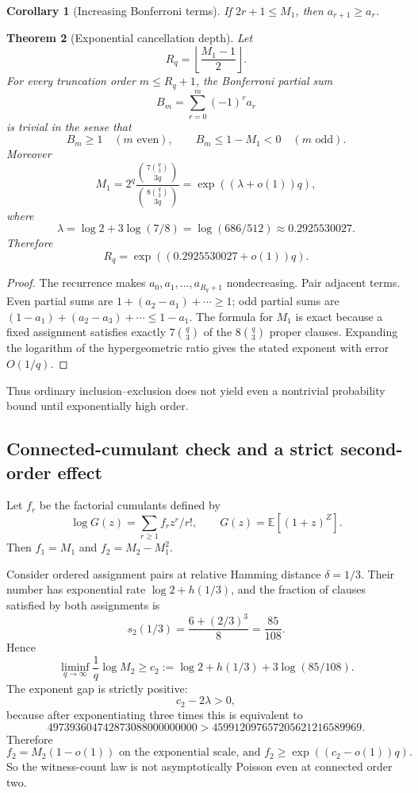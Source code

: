\documentclass[11pt]{article}
\newtheorem{theorem}{Theorem}
\newtheorem{corollary}[theorem]{Corollary}
\begin{document}
\begin{corollary}[Increasing Bonferroni terms]
If $2r+1\le M_1$, then $a_{r+1}\ge a_r$.
\end{corollary}

\begin{theorem}[Exponential cancellation depth]
Let
\[R_q=\left\lfloor\frac{M_1-1}{2}\right\rfloor.\]
For every truncation order $m\le R_q+1$, the Bonferroni partial sum
\[B_m=\sum_{r=0}^m(-1)^ra_r\]
is trivial in the sense that
\[B_m\ge1\quad(m\text{ even}),\qquad B_m\le1-M_1<0\quad(m\text{ odd}).\]
Moreover
\[M_1=2^q\frac{\binom{7\binom q3}{3q}}{\binom{8\binom q3}{3q}}=\exp((\lambda+o(1))q),\]
where
\[\lambda=\log2+3\log(7/8)=\log(686/512)\approx0.2925530027.\]
Therefore
\[\boxed{R_q=\exp((0.2925530027+o(1))q).}\]
\end{theorem}
\begin{proof}
The recurrence makes $a_0,a_1,\ldots,a_{R_q+1}$ nondecreasing. Pair adjacent terms. Even partial sums are $1+(a_2-a_1)+\cdots\ge1$; odd partial sums are $(1-a_1)+(a_2-a_3)+\cdots\le1-a_1$. The formula for $M_1$ is exact because a fixed assignment satisfies exactly $7\binom q3$ of the $8\binom q3$ proper clauses. Expanding the logarithm of the hypergeometric ratio gives the stated exponent with error $O(1/q)$.
\end{proof}

Thus ordinary inclusion--exclusion does not yield even a nontrivial probability bound until exponentially high order.

\subsection{Connected-cumulant check and a strict second-order effect}
Let $f_r$ be the factorial cumulants defined by
\[\log G(z)=\sum_{r\ge1}f_rz^r/r!,\qquad G(z)=\mathbb E[(1+z)^Z].\]
Then $f_1=M_1$ and $f_2=M_2-M_1^2$.

Consider ordered assignment pairs at relative Hamming distance $\delta=1/3$. Their number has exponential rate $\log2+h(1/3)$, and the fraction of clauses satisfied by both assignments is
\[s_2(1/3)=\frac{6+(2/3)^3}{8}=\frac{85}{108}.\]
Hence
\[\liminf_{q\to\infty}\frac1q\log M_2\ge c_2:=\log2+h(1/3)+3\log(85/108).\]
The exponent gap is strictly positive:
\[c_2-2\lambda>0,\]
because after exponentiating three times this is equivalent to
\[497393604742873088000000000>459912097657205621216589969.\]
Therefore
\[\boxed{f_2=M_2(1-o(1))\text{ on the exponential scale, and }f_2\ge\exp((c_2-o(1))q).}\]
So the witness-count law is not asymptotically Poisson even at connected order two.
\end{document}
